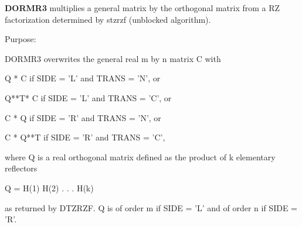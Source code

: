 {\bfseries D\+O\+R\+M\+R3} multiplies a general matrix by the orthogonal matrix from a R\+Z factorization determined by stzrzf (unblocked algorithm). 

 \begin{DoxyParagraph}{Purpose\+: }
\begin{DoxyVerb} DORMR3 overwrites the general real m by n matrix C with

       Q * C  if SIDE = 'L' and TRANS = 'N', or

       Q**T* C  if SIDE = 'L' and TRANS = 'C', or

       C * Q  if SIDE = 'R' and TRANS = 'N', or

       C * Q**T if SIDE = 'R' and TRANS = 'C',

 where Q is a real orthogonal matrix defined as the product of k
 elementary reflectors

       Q = H(1) H(2) . . . H(k)

 as returned by DTZRZF. Q is of order m if SIDE = 'L' and of order n
 if SIDE = 'R'.\end{DoxyVerb}
 
\end{DoxyParagraph}

